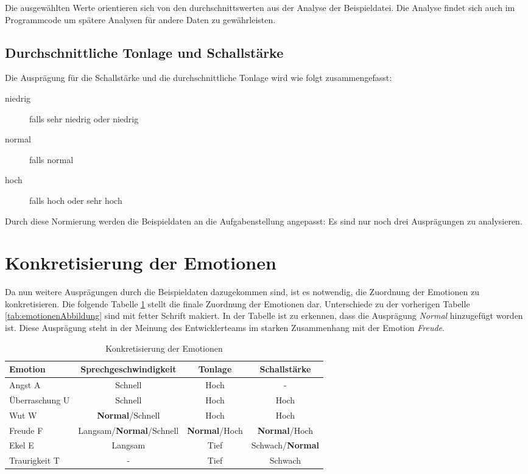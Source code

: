 Die ausgewählten Werte orientieren sich von den durchschnittswerten aus der Analyse der Beispieldatei. Die Analyse findet sich auch im Programmcode um spätere Analysen für andere Daten zu gewährleisten.

\subsection{Durchschnittliche Tonlage und Schallstärke}
Die Ausprägung für die Schallstärke und die durchschnittliche Tonlage wird wie folgt zusammengefasst:
\begin{description}
\item [niedrig] falls sehr niedrig oder niedrig
\item [normal] falls normal
\item [hoch] falls hoch oder sehr hoch
\end{description}
Durch diese Normierung werden die Beispieldaten an die Aufgabenstellung angepasst: Es sind nur noch drei Ausprägungen zu analysieren.

\section{Konkretisierung der Emotionen}
Da nun weitere Ausprägungen durch die Beispieldaten dazugekommen sind, ist es notwendig, die Zuordnung der Emotionen zu konkretisieren. Die folgende Tabelle \ref{tab:konkretisierteEmotionen} stellt die finale Zuordnung der Emotionen dar. Unterschiede zu der vorherigen Tabelle \ref{tab:emotionenAbbildung} sind mit fetter Schrift makiert. In der Tabelle ist zu erkennen, dass die Ausprägung \textit{Normal} hinzugefügt worden ist. Diese Ausprägung steht in der Meinung des Entwicklerteams im starken Zusammenhang mit der Emotion \textit{Freude}. 


\begin{table}[h]
\begin{tabular}{ l | c | c | c}
  Emotion & Sprechgeschwindigkeit & Tonlage & Schallstärke \\
  \hline 
  Angst A & Schnell & Hoch & - \\
  Überraschung U & Schnell & Hoch & Hoch \\
  Wut W & \textbf{Normal}/Schnell & Hoch & Hoch \\
  Freude F & Langsam/\textbf{Normal}/Schnell & \textbf{Normal}/Hoch &\textbf{Normal}/Hoch\\
  Ekel E & Langsam & Tief & Schwach/\textbf{Normal} \\
  Traurigkeit T & - & Tief & Schwach \\
\end{tabular}
\caption{Konkretisierung der Emotionen}
\label{tab:konkretisierteEmotionen}
\end{table}


